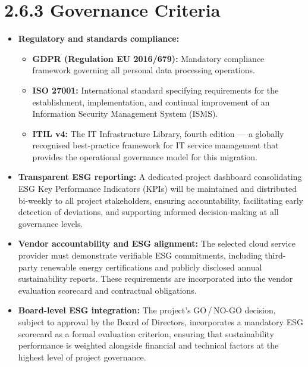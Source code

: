 \section{2.6.3 Governance Criteria}

\begin{itemize}[leftmargin=*, label=\textcolor{midgreen}{$\bullet$}]

  \item \textbf{Regulatory and standards compliance:}
    \begin{itemize}[label=\textcolor{lightgreen}{--}]
      \item \textbf{GDPR (Regulation EU 2016/679):} Mandatory compliance
        framework governing all personal data processing operations.
      \item \textbf{ISO 27001:} International standard specifying
        requirements for the establishment, implementation, and continual
        improvement of an Information Security Management System (ISMS).
      \item \textbf{ITIL v4:} The IT Infrastructure Library, fourth
        edition --- a globally recognised best-practice framework for IT
        service management that provides the operational governance model
        for this migration.
    \end{itemize}

  \item \textbf{Transparent ESG reporting:} A dedicated project dashboard
    consolidating ESG Key Performance Indicators (KPIs) will be maintained
    and distributed bi-weekly to all project stakeholders, ensuring
    accountability, facilitating early detection of deviations, and
    supporting informed decision-making at all governance levels.

  \item \textbf{Vendor accountability and ESG alignment:} The selected
    cloud service provider must demonstrate verifiable ESG commitments,
    including third-party renewable energy certifications and publicly
    disclosed annual sustainability reports. These requirements are
    incorporated into the vendor evaluation scorecard and contractual
    obligations.

  \item \textbf{Board-level ESG integration:} The project's GO\,/\,NO-GO
    decision, subject to approval by the Board of Directors, incorporates
    a mandatory ESG scorecard as a formal evaluation criterion, ensuring
    that sustainability performance is weighted alongside financial and
    technical factors at the highest level of project governance.

\end{itemize}

